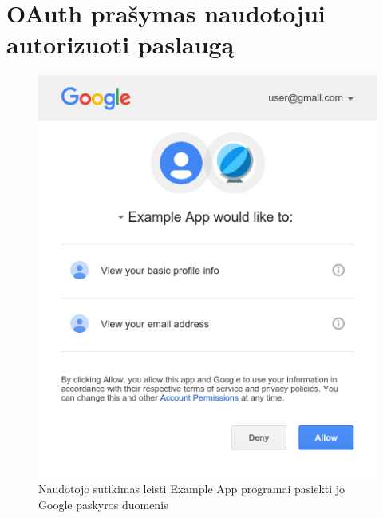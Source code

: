 \section{OAuth prašymas naudotojui autorizuoti paslaugą}
\label{appendix:SSOUserConsent}

\begin{figure}[H]
    \centering
    \includegraphics[scale=0.7]{img/OAuthUserConsent}
    \caption{Naudotojo sutikimas leisti Example App programai pasiekti jo Google paskyros duomenis}
    \label{fig:SSOUserConsent}
\end{figure}